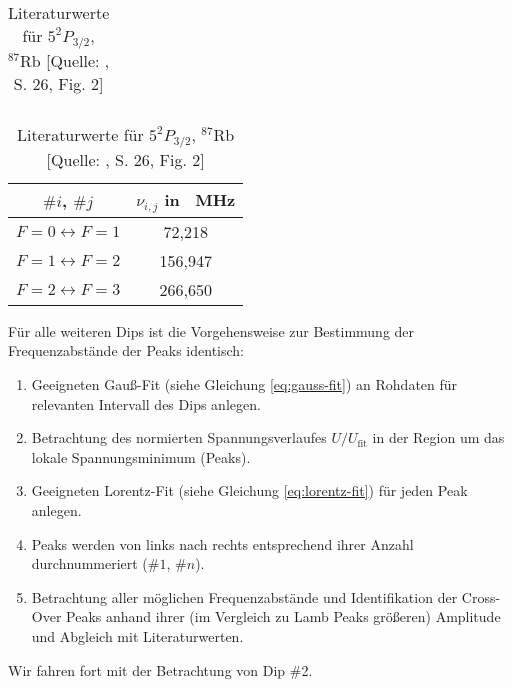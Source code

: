 \begin{table}[H]
\begin{minipage}{8cm}
\begin{tabular}{|c|c|}
            \hline
        \end{tabular}
        \caption{Errechnete Frequenzabstände  der Peaks für Dip \textcolor{red!80!black}{\#1}}
        \label{tab:plot-data20-gain30-01-dip-1}
    \end{minipage}
    \hskip0.5cm
    \begin{minipage}{8cm}
        \centering
        \begin{tabular}{|c|c|}
            \hline
            $\#i$, $\#j$    &   $\nu_{i,j}$ in \SI{}{\mega \hertz}  \\
            \hline
            \hline
             $F = 0 \longleftrightarrow F = 1$      &        72,218     \\
            \hline
             $F = 1 \longleftrightarrow F = 2$      &       156,947     \\
            \hline
             $F = 2 \longleftrightarrow F = 3$      &       266,650     \\
            \hline
        \end{tabular}
        \caption{Literaturwerte für $5^{2}P_{3/2}$, $^{87}\text{Rb}$ [Quelle: \cite{Steck87}, S. 26, Fig. 2]}
        \label{tab:lit-5p-87-rb}
    \end{minipage}
\end{table}

\noindent Für alle weiteren Dips ist die Vorgehensweise zur Bestimmung der Frequenzabstände der Peaks identisch:
\begin{enumerate}[1.]
    \item Geeigneten Gauß-Fit (siehe Gleichung \eqref{eq:gauss-fit}) an Rohdaten für relevanten Intervall des Dips anlegen.
    \item Betrachtung des normierten Spannungsverlaufes $U/U_{\text{fit}}$ in der Region um das lokale Spannungsminimum (Peaks).
    \item Geeigneten Lorentz-Fit (siehe Gleichung \eqref{eq:lorentz-fit}) für jeden Peak anlegen.
    \item Peaks werden von links nach rechts entsprechend ihrer Anzahl durchnummeriert ($\#1$, $\#n$).
    \item Betrachtung aller möglichen Frequenzabstände und Identifikation der Cross-Over Peaks anhand ihrer (im Vergleich zu Lamb Peaks größeren) Amplitude und Abgleich mit Literaturwerten.
\end{enumerate}

\noindent Wir fahren fort mit der Betrachtung von Dip \textcolor{green!50!black}{\#2}.

